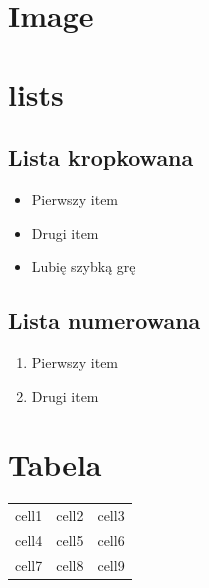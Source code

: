 \documentclass[12pt, letterpaper]{article}
\begin{document}
\newpage

\tableofcontents

\newpage

\section{Image}


\section{lists}

\subsection{Lista kropkowana}
\begin{itemize}
\item Pierwszy item
\item Drugi item
\item Lubię szybką grę
\end{itemize}

\subsection{Lista numerowana}
\begin{enumerate}
\item Pierwszy item
\item Drugi item
\end{enumerate}

\section{Tabela}

\begin{center}
\begin{tabular}{|c|c|c|}
\hline
cell1 & cell2 & cell3 \\
cell4 & cell5 & cell6 \\
cell7 & cell8 & cell9 \\
\hline
\end{tabular}
\end{center}
\end{document}
